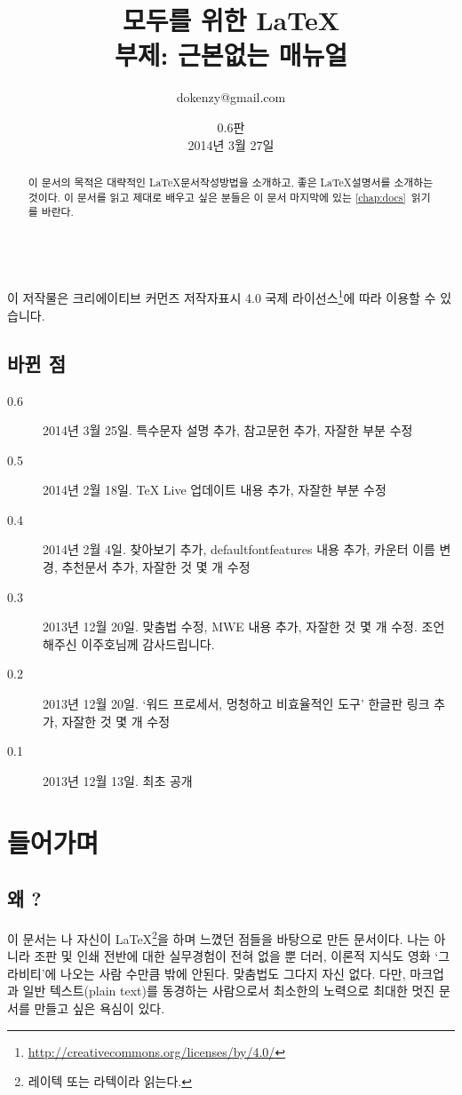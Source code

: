 \documentclass[oneside, chapter, 11pt]{oblivoir}
\title{모두를 위한 \LaTeX\\\small{부제: 근본없는 매뉴얼}}
\author{dokenzy@gmail.com}
\date{0.6판\\2014년 3월 27일}
\begin{document}
\maketitle
\begin{abstract}
이 문서의 목적은 대략적인 \LaTeX 문서작성방법을 소개하고, 좋은 \LaTeX 설명서를 소개하는 것이다. 이 문서를 읽고  제대로 배우고 싶은 분들은 이 문서 마지막에 있는 \ref{chap:docs}\chaptername~\을 읽기를 바란다.
\end{abstract}

\begin{center}
\ccbyncsa\\
{\scriptsize 이 저작물은 크리에이티브 커먼즈 저작자표시 4.0 국제 라이선스\footnote{\href{http://creativecommons.org/licenses/by/4.0/}{http://creativecommons.org/licenses/by/4.0/}}에 따라 이용할 수 있습니다.}
\end{center}

\clearpage
\section*{바뀐 점}
\begin{description}
\item[0.6] 2014년 3월 25일. 특수문자 설명 추가, 참고문헌 추가, 자잘한 부분 수정
\item[0.5] 2014년 2월 18일. TeX Live 업데이트 내용 추가, 자잘한 부분 수정
\item[0.4] 2014년 2월 4일. 찾아보기 추가, defaultfontfeatures 내용 추가, 카운터 이름 변경, 추천문서 추가, 자잘한 것 몇 개 수정
\item[0.3] 2013년 12월 20일. 맞춤법 수정, MWE 내용 추가, 자잘한 것 몇 개 수정. 조언해주신 이주호님께 감사드립니다.
\item[0.2] 2013년 12월 20일. `워드 프로세서, 멍청하고 비효율적인 도구' 한글판 링크 추가, 자잘한 것 몇 개 수정
\item[0.1] 2013년 12월 13일. 최초 공개
\end{description}
\clearpage

\tableofcontents

\frontmatter
\chapter{들어가며}
\section{왜 ?}
이 문서는 나 자신이 \LaTeX\footnote{레이텍 또는 라텍이라 읽는다.}을 하며 느꼈던 점들을 바탕으로 만든  문서이다. 나는  아니라 조판 및 인쇄 전반에 대한 실무경험이 전혀 없을 뿐 더러, 이론적 지식도 영화 `그라비티'에 나오는 사람 수만큼 밖에 안된다. 맞춤법도 그다지 자신 없다. 다만, 마크업과 일반 텍스트(plain text)를 동경하는 사람으로서 최소한의 노력으로 최대한 멋진 문서를 만들고 싶은 욕심이 있다. 
\end{document}
